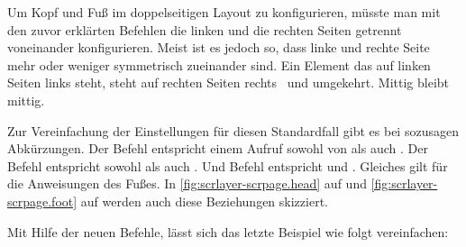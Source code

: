 \begin{Declaration}
\end{Declaration}
Um Kopf und Fuß im doppelseitigen Layout zu konfigurieren, müsste man mit den
zuvor erklärten Befehlen die linken und die rechten Seiten getrennt
voneinander konfigurieren. Meist ist es jedoch so, dass linke und rechte Seite
mehr oder weniger symmetrisch zueinander sind. Ein Element das auf linken
Seiten links steht, steht auf rechten Seiten rechts%
\iffalse%
. Ein Element, das auf linken Seiten rechts steht, steht auf rechten Seiten
links.
Mittig angeordnete Elemente sind normalerweise auf beiden Seiten mittig
angeordnet.%
\else%
\ und umgekehrt. Mittig bleibt mittig.%
\fi%

Zur Vereinfachung der Einstellungen für diesen Standardfall gibt es bei
 sozusagen Abkürzungen. Der Befehl 
entspricht einem Aufruf sowohl von  als auch
. Der Befehl  entspricht sowohl
 als auch . Und
Befehl  entspricht  und
. Gleiches gilt für die Anweisungen des
Fußes. In \autoref{fig:scrlayer-scrpage.head} auf
 und
\autoref{fig:scrlayer-scrpage.foot} auf
 werden auch diese Beziehungen
skizziert.
%
\begin{Example}
  \iffalse%
  Das letzte Beispiel lässt sich so vereinfachen:
  \else
  Mit Hilfe der neuen Befehle, lässt sich das letzte Beispiel wie folgt
  vereinfachen:
  \fi
{}
\iffalse%
  Wie zusehen ist, konnte die Hälfte der Befehle eingespart und trotzdem
  dasselbe Ergebnis erzielt werden.
\fi
\end{Example}%

